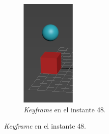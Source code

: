 \documentclass{article}
\begin{document}
\begin{figure}[H]
\begin{subfigure}[H]{0.15\textwidth}
	\end{subfigure}
    \hfill
	\begin{subfigure}[H]{0.15\textwidth}
	    \centering
	    \includegraphics[width=\textwidth]{imagenes/Ejercicio 1/p1_ins48.png}
	    \caption{\textit{Keyframe} en el instante 48.}

\end{subfigure}
\end{figure}
\end{document}
